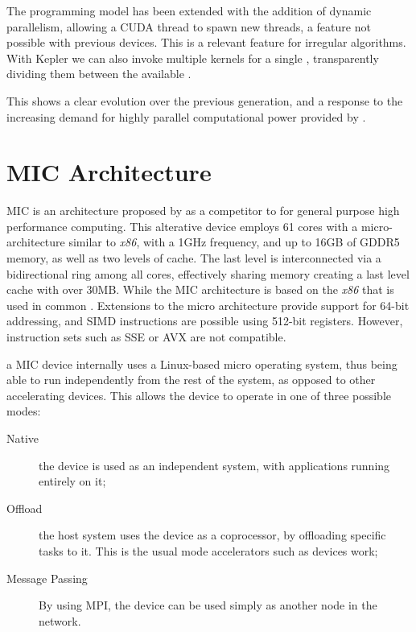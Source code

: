 \documentclass[main.tex]{subfiles}
\begin{document}

The programming model has been extended with the addition of dynamic parallelism, allowing a \acs{CUDA} thread to spawn new threads, a feature not possible with previous \nvidia devices. This is a relevant feature for irregular algorithms. With Kepler we can also invoke multiple kernels for a single \gpu, transparently dividing them between the available \smxs.

This shows a clear evolution over the previous generation, and a response to the increasing demand for highly parallel computational power provided by \gpus.


\section{MIC Architecture}

\acf{MIC} \cite{Intel:MIC:QuickStartGuide} is an architecture proposed by \intel as a competitor to \gpus for general purpose high performance computing. This alterative device employs 61 cores with a micro-architecture similar to \textit{x86}, with a 1GHz frequency, and up to 16GB of GDDR5 memory, as well as two levels of cache. The last level is interconnected via a bidirectional ring among all cores, effectively sharing memory creating a last level cache with over 30MB.
While the \acs{MIC} architecture is based on the \textit{x86} that is used in common \cpus. Extensions to the micro architecture provide support for 64-bit addressing, and SIMD instructions are possible using 512-bit registers. However, instruction sets such as \acf{SSE} or \acf{AVX} are not compatible.

a \acs{MIC} device internally uses a Linux-based micro operating system, thus being able to run independently from the rest of the system, as opposed to other accelerating devices. This allows the device to operate in one of three possible modes:
\begin{description}
\item[Native] the device is used as an independent system, with applications running entirely on it;
\item[Offload] the host system uses the device as a coprocessor, by offloading specific tasks to it. This is the usual mode accelerators such as \cuda devices work;
\item[Message Passing] By using \acs{MPI}, the device can be used simply as another node in the network.
\end{description}
\end{document}
